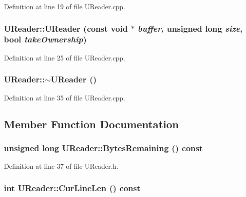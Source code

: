 Definition at line 19 of file UReader.cpp.\hypertarget{class_u_reader_b7a27badfa0d9e95fa8397749103aa46}{
\subsubsection[{UReader}]{\setlength{\rightskip}{0pt plus 5cm}UReader::UReader (const void $\ast$ {\em buffer}, \/  unsigned long {\em size}, \/  bool {\em takeOwnership})}}
\label{class_u_reader_b7a27badfa0d9e95fa8397749103aa46}




Definition at line 25 of file UReader.cpp.\hypertarget{class_u_reader_7ef65ceb8dd3ff92f929a5bfec1f7af0}{
\subsubsection[{$\sim$UReader}]{\setlength{\rightskip}{0pt plus 5cm}UReader::$\sim$UReader ()}}
\label{class_u_reader_7ef65ceb8dd3ff92f929a5bfec1f7af0}




Definition at line 35 of file UReader.cpp.

\subsection{Member Function Documentation}
\hypertarget{class_u_reader_dbcd750f18a05e601ac99f80bf3f2179}{
\subsubsection[{BytesRemaining}]{\setlength{\rightskip}{0pt plus 5cm}unsigned long UReader::BytesRemaining () const}}
\label{class_u_reader_dbcd750f18a05e601ac99f80bf3f2179}




Definition at line 37 of file UReader.h.\hypertarget{class_u_reader_1e7d9ae5c4bc6ceacfd3fb14212a8d59}{
\subsubsection[{CurLineLen}]{\setlength{\rightskip}{0pt plus 5cm}int UReader::CurLineLen () const}}
\label{class_u_reader_1e7d9ae5c4bc6ceacfd3fb14212a8d59}




